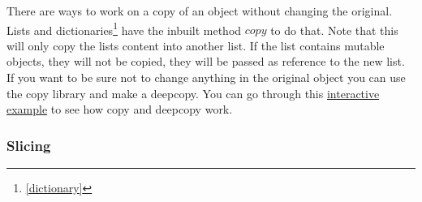 \documentclass{article}
\begin{document}
There are ways to work on a copy of an object without changing the original.
Lists and dictionaries\footnote{\ref{dictionary}} have the inbuilt method $copy$
to do that.
Note that this will only copy the lists content into another list.
If the list contains mutable objects, they will not be copied, they will be passed
as reference to the new list.
If you want to be sure not to change anything in the original object you can use
the copy library and make a deepcopy.
You can go through this \href{http://pythontutor.com/visualize.html#code=an_empty_list%20%3D%20list%28%29%0Aanother_empty_list%20%3D%20%5B%5D%0A%0Alist_for_content%20%3D%20an_empty_list.copy%28%29%0Alist_for_content.append%281%29%0A%23%20The%20name%20of%20an_empty_list%20is%20now%20a%20lie.%0Alist_for_content.append%282%29%0Alist_for_content.append%283%29%0A%0Aa_list_with_content%20%3D%20%5B1%20,2%20,3%5D%0A%0Aprint%28an_empty_list%29%0Aprint%28another_empty_list%29%0Aprint%28list_for_content%29%0Aprint%28a_list_with_content%29%0A%0Aprint%28len%28an_empty_list%29%29%0A%0Aimport%20copy%0A%0Aa_list_of_empty_lists%20%3D%20%5B%0A%20%20%20%20an_empty_list,%0A%20%20%20%20another_empty_list%0A%5D%0A%0Aa_list_copy%20%3D%20a_list_of_empty_lists.copy%28%29%0Aa_list_deepcopy%20%3D%20copy.deepcopy%28a_list_of_empty_lists%29%0Aa_list_copy.append%28%5B1,2,3%5D%29%0Aa_list_copy%5B0%5D.append%281%29%20%23%20This%20will%20change%20the%20original%20an_empty_list&cumulative=false&curInstr=15&heapPrimitives=nevernest&mode=display&origin=opt-frontend.js&py=3&rawInputLstJSON=%5B%5D&textReferences=false}
{interactive example} to see how copy and deepcopy work.





\subsubsection{Slicing}
\end{document}
